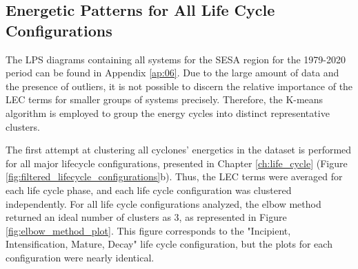 
\subsection{Energetic Patterns for All Life Cycle Configurations}\label{sec:energy_patterns}

The LPS diagrams containing all systems for the SESA region for the 1979-2020 period can be found in Appendix \ref{ap:06}. Due to the large amount of data and the presence of outliers, it is not possible to discern the relative importance of the LEC terms for smaller groups of systems precisely. Therefore, the K-means algorithm is employed to group the energy cycles into distinct representative clusters.

The first attempt at clustering all cyclones' energetics in the dataset is performed for all major lifecycle configurations, presented in Chapter \ref{ch:life_cycle} (Figure \ref{fig:filtered_lifecycle_configurations}b). Thus, the LEC terms were averaged for each life cycle phase, and each life cycle configuration was clustered independently. For all life cycle configurations analyzed, the elbow method returned an ideal number of clusters as 3, as represented in Figure \ref{fig:elbow_method_plot}. This figure corresponds to the "Incipient, Intensification, Mature, Decay" life cycle configuration, but the plots for each configuration were nearly identical.

